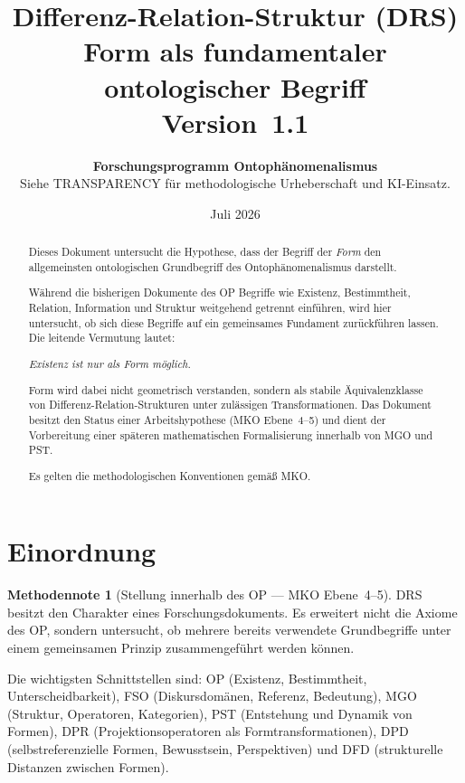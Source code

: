 \documentclass[11pt,a4paper]{article}
\title{
  \textbf{Differenz-Relation-Struktur (DRS)}\\[0.4em]
  {\large Form als fundamentaler ontologischer Begriff}\\[0.5em]
  {\normalsize Version~1.1}
}
\author{
  \textbf{Forschungsprogramm Ontoph\"{a}nomenalismus}\\
  \small Siehe TRANSPARENCY f\"{u}r methodologische Urheberschaft und KI-Einsatz.
}
\date{Juli 2026}
\theoremstyle{plain}
\theoremstyle{definition}
\newtheorem{methodennote}{Methodennote}[section]
\begin{document}
\maketitle

\begin{abstract}
Dieses Dokument untersucht die Hypothese, dass der Begriff der \emph{Form} den
allgemeinsten ontologischen Grundbegriff des Ontoph\"{a}nomenalismus darstellt.

W\"{a}hrend die bisherigen Dokumente des OP Begriffe wie Existenz, Bestimmtheit,
Relation, Information und Struktur weitgehend getrennt einf\"{u}hren, wird hier
untersucht, ob sich diese Begriffe auf ein gemeinsames Fundament zur\"{u}ckf\"{u}hren
lassen. Die leitende Vermutung lautet:

\begin{center}
\emph{Existenz ist nur als Form m\"{o}glich.}
\end{center}

Form wird dabei nicht geometrisch verstanden, sondern als stabile
\"{A}quivalenzklasse von Differenz-Relation-Strukturen unter zul\"{a}ssigen
Transformationen. Das Dokument besitzt den Status einer Arbeitshypothese
(MKO Ebene~4--5) und dient der Vorbereitung einer sp\"{a}teren mathematischen
Formalisierung innerhalb von MGO und PST.

Es gelten die methodologischen Konventionen gem\"{a}\ss{} MKO.
\end{abstract}

\tableofcontents
\newpage

\section{Einordnung}

\begin{methodennote}[Stellung innerhalb des OP --- MKO Ebene~4--5]
DRS besitzt den Charakter eines Forschungsdokuments. Es erweitert nicht die Axiome
des OP, sondern untersucht, ob mehrere bereits verwendete Grundbegriffe unter einem
gemeinsamen Prinzip zusammengef\"{u}hrt werden k\"{o}nnen.

Die wichtigsten Schnittstellen sind: OP (Existenz, Bestimmtheit, Unterscheidbarkeit),
FSO (Diskursdom\"{a}nen, Referenz, Bedeutung), MGO (Struktur, Operatoren, Kategorien),
PST (Entstehung und Dynamik von Formen), DPR (Projektionsoperatoren als
Formtransformationen), DPD (selbstreferenzielle Formen, Bewusstsein, Perspektiven)
und DFD (strukturelle Distanzen zwischen Formen).
\end{methodennote}
\end{document}
